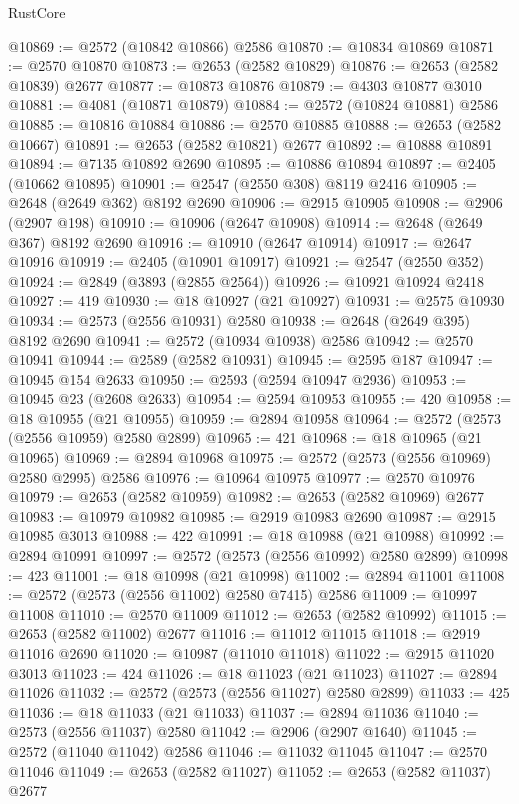 \begin{lexlean}{RustCore}
\begin{coremodule}
@10869 := @2572 (@10842 @10866) @2586
@10870 := @10834 @10869
@10871 := @2570 @10870
@10873 := @2653 (@2582 @10829)
@10876 := @2653 (@2582 @10839) @2677
@10877 := @10873 @10876
@10879 := @4303 @10877 @3010
@10881 := @4081 (@10871 @10879)
@10884 := @2572 (@10824 @10881) @2586
@10885 := @10816 @10884
@10886 := @2570 @10885
@10888 := @2653 (@2582 @10667)
@10891 := @2653 (@2582 @10821) @2677
@10892 := @10888 @10891
@10894 := @7135 @10892 @2690
@10895 := @10886 @10894
@10897 := @2405 (@10662 @10895)
@10901 := @2547 (@2550 @308) @8119 @2416
@10905 := @2648 (@2649 @362) @8192 @2690
@10906 := @2915 @10905
@10908 := @2906 (@2907 @198)
@10910 := @10906 (@2647 @10908)
@10914 := @2648 (@2649 @367) @8192 @2690
@10916 := @10910 (@2647 @10914)
@10917 := @2647 @10916
@10919 := @2405 (@10901 @10917)
@10921 := @2547 (@2550 @352)
@10924 := @2849 (@3893 (@2855 @2564))
@10926 := @10921 @10924 @2418
@10927 := 419
@10930 := @18 @10927 (@21 @10927)
@10931 := @2575 @10930
@10934 := @2573 (@2556 @10931) @2580
@10938 := @2648 (@2649 @395) @8192 @2690
@10941 := @2572 (@10934 @10938) @2586
@10942 := @2570 @10941
@10944 := @2589 (@2582 @10931)
@10945 := @2595 @187
@10947 := @10945 @154 @2633
@10950 := @2593 (@2594 @10947 @2936)
@10953 := @10945 @23 (@2608 @2633)
@10954 := @2594 @10953
@10955 := 420
@10958 := @18 @10955 (@21 @10955)
@10959 := @2894 @10958
@10964 := @2572 (@2573 (@2556 @10959) @2580 @2899)
@10965 := 421
@10968 := @18 @10965 (@21 @10965)
@10969 := @2894 @10968
@10975 := @2572 (@2573 (@2556 @10969) @2580 @2995) @2586
@10976 := @10964 @10975
@10977 := @2570 @10976
@10979 := @2653 (@2582 @10959)
@10982 := @2653 (@2582 @10969) @2677
@10983 := @10979 @10982
@10985 := @2919 @10983 @2690
@10987 := @2915 @10985 @3013
@10988 := 422
@10991 := @18 @10988 (@21 @10988)
@10992 := @2894 @10991
@10997 := @2572 (@2573 (@2556 @10992) @2580 @2899)
@10998 := 423
@11001 := @18 @10998 (@21 @10998)
@11002 := @2894 @11001
@11008 := @2572 (@2573 (@2556 @11002) @2580 @7415) @2586
@11009 := @10997 @11008
@11010 := @2570 @11009
@11012 := @2653 (@2582 @10992)
@11015 := @2653 (@2582 @11002) @2677
@11016 := @11012 @11015
@11018 := @2919 @11016 @2690
@11020 := @10987 (@11010 @11018)
@11022 := @2915 @11020 @3013
@11023 := 424
@11026 := @18 @11023 (@21 @11023)
@11027 := @2894 @11026
@11032 := @2572 (@2573 (@2556 @11027) @2580 @2899)
@11033 := 425
@11036 := @18 @11033 (@21 @11033)
@11037 := @2894 @11036
@11040 := @2573 (@2556 @11037) @2580
@11042 := @2906 (@2907 @1640)
@11045 := @2572 (@11040 @11042) @2586
@11046 := @11032 @11045
@11047 := @2570 @11046
@11049 := @2653 (@2582 @11027)
@11052 := @2653 (@2582 @11037) @2677

\end{coremodule}
\end{lexlean}

